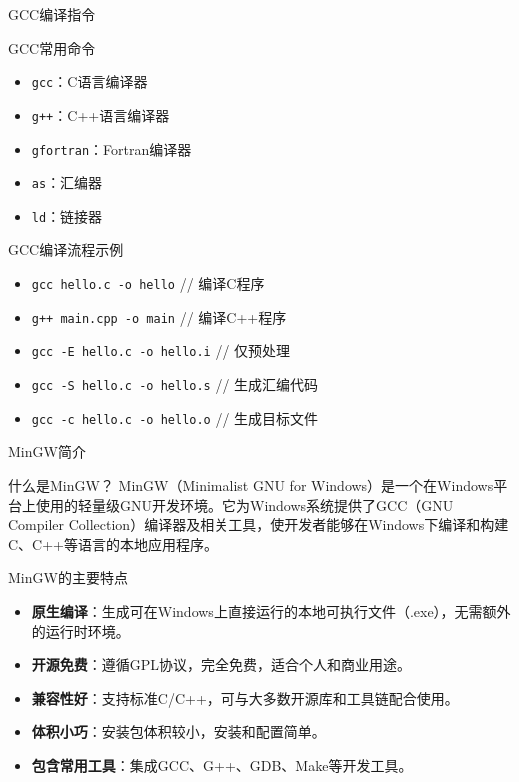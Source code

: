 \documentclass[UTF8,aspectratio=169]{beamer}
\begin{document}
\begin{frame}{GCC编译指令}
    \begin{ytublock}{GCC常用命令}
        \begin{itemize}
            \item \texttt{gcc}：C语言编译器
            \item \texttt{g++}：C++语言编译器
            \item \texttt{gfortran}：Fortran编译器
            \item \texttt{as}：汇编器
            \item \texttt{ld}：链接器
        \end{itemize}
    \end{ytublock}

    \begin{ytublock}{GCC编译流程示例}
        \begin{itemize}
            \item \texttt{gcc hello.c -o hello} \hspace{1em} // 编译C程序
            \item \texttt{g++ main.cpp -o main} \hspace{1em} // 编译C++程序
            \item \texttt{gcc -E hello.c -o hello.i} \hspace{1em} // 仅预处理
            \item \texttt{gcc -S hello.c -o hello.s} \hspace{1em} // 生成汇编代码
            \item \texttt{gcc -c hello.c -o hello.o} \hspace{1em} // 生成目标文件
        \end{itemize}
    \end{ytublock}
\end{frame}

\begin{frame}{MinGW简介}
    \begin{ytublock}{什么是MinGW？}
        MinGW（Minimalist GNU for Windows）是一个在Windows平台上使用的轻量级GNU开发环境。它为Windows系统提供了GCC（GNU Compiler Collection）编译器及相关工具，使开发者能够在Windows下编译和构建C、C++等语言的本地应用程序。
    \end{ytublock}
    \begin{ytublock}{MinGW的主要特点}
        \begin{itemize}
            \item \textbf{原生编译}：生成可在Windows上直接运行的本地可执行文件（.exe），无需额外的运行时环境。
            \item \textbf{开源免费}：遵循GPL协议，完全免费，适合个人和商业用途。
            \item \textbf{兼容性好}：支持标准C/C++，可与大多数开源库和工具链配合使用。
            \item \textbf{体积小巧}：安装包体积较小，安装和配置简单。
            \item \textbf{包含常用工具}：集成GCC、G++、GDB、Make等开发工具。
        \end{itemize}
    \end{ytublock}
\end{frame}
\end{document}
